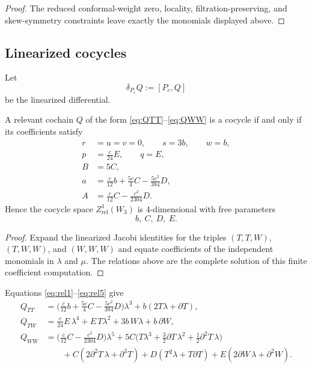 \begin{proof}
The reduced conformal-weight zero, locality, filtration-preserving, and skew-symmetry
constraints leave exactly the monomials displayed above.
\end{proof}

\subsection{Linearized cocycles}

Let
\[
\delta_{P_c}Q:=[P_c,Q]
\]
be the linearized differential.

\begin{proposition}\label{prop:W3cocycles}
A relevant cochain $Q$ of the form \eqref{eq:QTT}--\eqref{eq:QWW} is a cocycle if and only if
its coefficients satisfy
\begin{align}
r&=u=v=0,\qquad s=3b,\qquad w=b,\label{eq:rel1}\\
p&=\frac c{24}E,\qquad q=E,\label{eq:rel2}\\
B&=5C,\label{eq:rel3}\\
a&=\frac c{12}b+\frac{5c}{4}C-\frac{5c^2}{384}D,\label{eq:rel4}\\
A&=\frac c{12}C-\frac{c^2}{2304}D.\label{eq:rel5}
\end{align}
Hence the cocycle space $Z^1_{\mathrm{rel}}(W_3)$ is $4$-dimensional with free parameters
\[
b,\ C,\ D,\ E.
\]
\end{proposition}

\begin{proof}
Expand the linearized Jacobi identities for the triples $(T,T,W)$, $(T,W,W)$, and
$(W,W,W)$ and equate coefficients of the independent monomials in $\lambda$ and $\mu$.
The relations above are the complete solution of this finite coefficient computation.
\end{proof}

\begin{remark}
Equations \eqref{eq:rel1}--\eqref{eq:rel5} give
\begin{align*}
Q_{TT}
&=
\Big(\frac c{12}b+\frac{5c}{4}C-\frac{5c^2}{384}D\Big)\lambda^3+b(2T\lambda+\partial T),\\[4pt]
Q_{TW}
&=
\frac c{24}E\,\lambda^4+E\,T\lambda^2+3b\,W\lambda+b\,\partial W,\\[4pt]
Q_{WW}
&=
\Big(\frac c{12}C-\frac{c^2}{2304}D\Big)\lambda^5
+5C\Big(T\lambda^3+\frac32\partial T\,\lambda^2+\frac12\partial^2T\,\lambda\Big)\\
&\qquad
+C(2\partial^2T\,\lambda+\partial^3T)
+D(T^2\lambda+T\partial T)
+E(2\partial W\,\lambda+\partial^2W).
\end{align*}
\end{remark}

